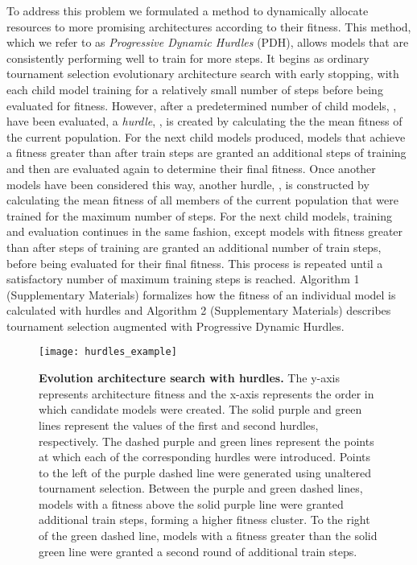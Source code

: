 \documentclass{article}
\begin{document}
To address this problem we formulated a method to dynamically allocate resources to more promising architectures according to their fitness. This method, which we refer to as \textit{Progressive Dynamic Hurdles} (PDH), allows models that are consistently performing well to train for more steps. It begins as ordinary tournament selection evolutionary architecture search with early stopping, with each child model training for a relatively small  number of steps before being evaluated for fitness. However, after a predetermined number of child models, , have been evaluated,  a \textit{hurdle}, , is created by calculating the the mean fitness of the current population. For the next  child models produced, models that achieve a fitness greater than  after  train steps are granted an additional  steps of training and then are evaluated again to determine their final fitness. Once another  models have been considered this way, another hurdle, , is constructed by calculating the mean fitness of all members of the current population that were trained for the maximum number of steps. For the next  child models, training and evaluation continues in the same fashion, except models with fitness greater than  after  steps of training are granted an additional  number of train steps, before being evaluated for their final fitness. This process is repeated until a satisfactory number of maximum training steps is reached. Algorithm 1 (Supplementary Materials) formalizes how the fitness of an individual model is calculated with hurdles and Algorithm 2 (Supplementary Materials) describes tournament selection augmented with Progressive Dynamic Hurdles.

\begin{figure}[h!]
\vspace{-0.2in}
\centerline{\texttt{[image: hurdles\_example]}}
\caption{\textbf{Evolution architecture search with hurdles.} The y-axis represents architecture fitness and the x-axis represents the order in which candidate models were created. The solid purple and green lines represent the values of the first and second hurdles, respectively. The dashed purple and green lines represent the points at which each of the corresponding hurdles were introduced. Points to the left of the purple dashed line were generated using unaltered tournament selection. Between the purple and green dashed lines, models with a fitness above the solid purple line were granted additional train steps, forming a higher fitness cluster. To the right of the green dashed line, models with a fitness greater than the solid green line were granted a second round of additional train steps.} 
\vspace{-0.1in}
\end{figure}
\end{document}
